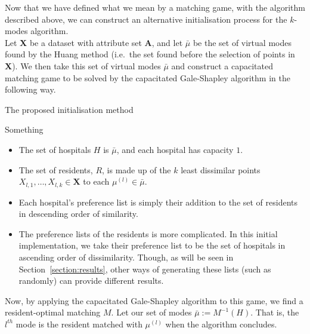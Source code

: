 Now that we have defined what we mean by a matching game, with the algorithm 
described above, we can construct an alternative initialisation process for the 
$k$-modes algorithm. \\

Let \textbf{X} be a dataset with attribute set \textbf{A}, and let \(\bar{\mu}\) 
be the set of virtual modes found by the Huang method (i.e.\ the set found 
before the selection of points in \textbf{X}). We then take this set of virtual 
modes \(\bar{\mu}\) and construct a capacitated matching game to be solved by 
the capacitated Gale-Shapley algorithm in the following way.

\begin{algorithm}[H]
\caption{The proposed initialisation method}
    \begin{algorithmic}[0]
            \State Something
        \EndFor
    \end{algorithmic}
\end{algorithm}



\begin{itemize}
    \item The set of hospitals \(H\) is \(\bar{\mu}\), and each hospital has 
        capacity \(1\).

    \item The set of residents, \(R\), is made up of the \(k\) least dissimilar 
        points \(X_{l,1}, \ldots, X_{l,k} \in \textbf{X}\) to each \(\mu^{(l)} 
        \in \bar{\mu}\).

	\item Each hospital's preference list is simply their addition to the set of
        residents in descending order of similarity.
	
	\item The preference lists of the residents is more complicated. In this 
        initial implementation, we take their preference list to be the set of 
        hospitals in ascending order of dissimilarity. Though, as will be seen 
        in Section~\ref{section:results}, other ways of generating these lists 
        (such as randomly) can provide different results.
\end{itemize}

Now, by applying the capacitated Gale-Shapley algorithm to this game, we find a 
resident-optimal matching \(M\). Let our set of modes \(\bar{\mu} := 
M^{-1}(H)\). That is, the \(l^{th}\) mode is the resident matched with
\(\mu^{(l)}\) when the algorithm concludes.

